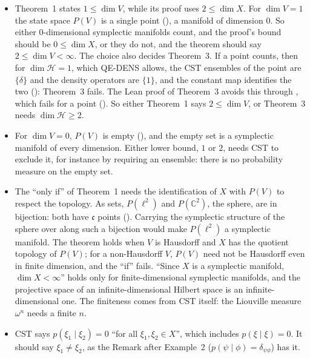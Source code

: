 \documentclass[11pt]{article}
\begin{document}
\begin{itemize}
\item Theorem~1 states $1 \le \dim V$, while its proof uses $2 \le \dim X$. For $\dim V = 1$ the
  state space $P(V)$ is a single point (), a manifold of
  dimension $0$. So either $0$-dimensional symplectic manifolds count, and the proof's bound
  should be $0 \le \dim X$, or they do not, and the theorem should say $2 \le \dim V < \infty$.
  The choice also decides Theorem~3. If a point counts, then for $\dim\mathcal H = 1$, which
  QE-DENS allows, the CST ensembles of the point are $\{\delta\}$ and the density operators are
  $\{1\}$, and the constant map identifies the two ():
  Theorem~3 fails. The Lean proof of Theorem~3 avoids this through ,
  which fails for a point (). So either Theorem~1 says
  $2 \le \dim V$, or Theorem~3 needs $\dim\mathcal H \ge 2$.
\item For $\dim V = 0$, $P(V)$ is empty (), and the empty set is a
  symplectic manifold of every dimension. Either lower bound, $1$ or $2$, needs CST to exclude it,
  for instance by requiring an ensemble: there is no probability measure on the empty set.
\item The ``only if'' of Theorem~1 needs the identification of $X$ with $P(V)$ to respect the
  topology. As sets, $P(\ell^2)$ and $P(\mathbb C^2)$, the sphere, are in bijection: both have
  $\mathfrak c$ points (). Carrying the symplectic structure
  of the sphere over along such a bijection would make $P(\ell^2)$ a symplectic manifold. The
  theorem holds when $V$ is Hausdorff and $X$ has the quotient topology of $P(V)$; for a
  non-Hausdorff $V$, $P(V)$ need not be Hausdorff even in finite dimension, and the ``if'' fails.
  ``Since $X$ is a symplectic manifold, $\dim X < \infty$'' holds only for finite-dimensional
  symplectic manifolds, and the projective space of an infinite-dimensional Hilbert space is an
  infinite-dimensional one. The finiteness comes from CST itself: the Liouville measure $\omega^n$
  needs a finite $n$.
\item CST says $p(\xi_1\mid\xi_2) = 0$ ``for all $\xi_1, \xi_2 \in X$'', which includes
  $p(\xi\mid\xi) = 0$. It should say $\xi_1 \ne \xi_2$, as the Remark after Example~2
  ($p(\psi\mid\phi) = \delta_{\psi\phi}$) has it.
\end{itemize}
\end{document}
